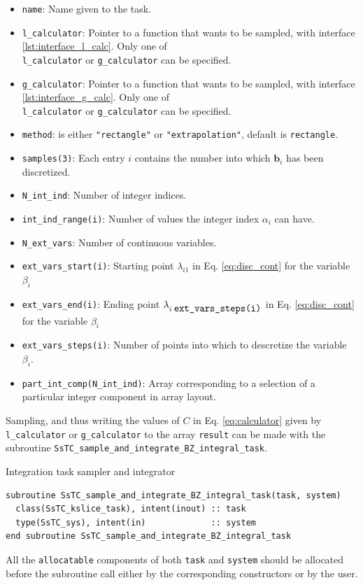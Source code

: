 \documentclass[10pt,a4paper]{article}
\begin{document}
\begin{tcolorbox}
\begin{itemize}
\item \verb|name|: Name given to the task.
\item \verb|l_calculator|: Pointer to a function that wants to be sampled, with interface \ref{lst:interface_l_calc}. Only one of \\ \verb|l_calculator| or \verb|g_calculator| can be specified.
\item \verb|g_calculator|: Pointer to a function that wants to be sampled, with interface \ref{lst:interface_g_calc}. Only one of \\ \verb|l_calculator| or \verb|g_calculator| can be specified.
\item \verb|method|: is either \verb|"rectangle"| or \verb|"extrapolation"|, default is \verb|rectangle|.
\item \verb|samples(3)|: Each entry $i$ contains the number into which $\bm{b}_i$ has been discretized.
\item \verb|N_int_ind|: Number of integer indices.
\item \verb|int_ind_range(i)|: Number of values the integer index $\alpha_i$ can have.
\item \verb|N_ext_vars|: Number of continuous variables.
\item \verb|ext_vars_start(i)|: Starting point $\lambda_{i1}$ in Eq. \eqref{eq:disc_cont} for the variable $\beta_i$
\item \verb|ext_vars_end(i)|: Ending point $\lambda_{i\;\verb|ext_vars_steps(i)|}$ in Eq. \eqref{eq:disc_cont} for the variable $\beta_i$
\item \verb|ext_vars_steps(i)|: Number of points into which to descretize the variable $\beta_i$.
\item \verb|part_int_comp(N_int_ind)|: Array corresponding to a selection of a particular integer component in array layout.
\end{itemize}
\end{tcolorbox}
Sampling, and thus writing the values of $C$ in Eq. \eqref{eq:calculator} given by \verb|l_calculator| or \verb|g_calculator| to the array \verb|result| can be made with the subroutine \verb|SsTC_sample_and_integrate_BZ_integral_task|.
\begin{codebox}{Integration task sampler and integrator}
\begin{lstlisting}[caption={Interface of the ``integrator" sampler and integrator.},captionpos=b]
subroutine SsTC_sample_and_integrate_BZ_integral_task(task, system)
  class(SsTC_kslice_task), intent(inout) :: task
  type(SsTC_sys), intent(in)             :: system
end subroutine SsTC_sample_and_integrate_BZ_integral_task
\end{lstlisting}
\end{codebox}
All the \verb|allocatable| components of both \verb|task| and \verb|system| should be allocated before the subroutine call either by the corresponding constructors or by the user.
\end{document}
